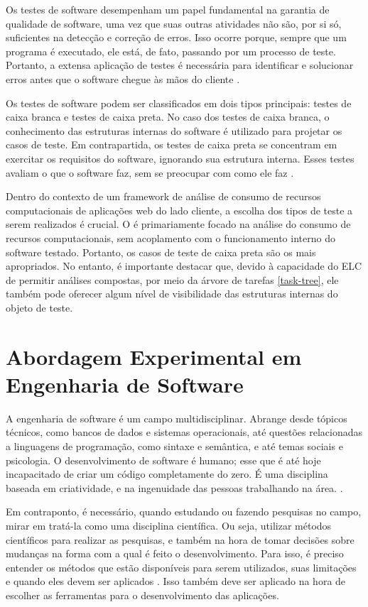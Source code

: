\documentclass[12pt]{tcc}
\begin{document}
		Os testes de software desempenham um papel fundamental na garantia de qualidade de software, uma vez que suas outras atividades não são, por si só, suficientes na detecção e correção de erros.
		Isso ocorre porque, sempre que um programa é executado, ele está, de fato, passando por um processo de teste.
		Portanto, a extensa aplicação de testes é necessária para identificar e solucionar erros antes que o software chegue às mãos do cliente \citep{pressman2009software}.

		Os testes de software podem ser classificados em dois tipos principais: testes de caixa branca e testes de caixa preta.
		No caso dos testes de caixa branca, o conhecimento das estruturas internas do software é utilizado para projetar os casos de teste.
		Em contrapartida, os testes de caixa preta se concentram em exercitar os requisitos do software, ignorando sua estrutura interna. Esses testes avaliam o que o software faz, sem se preocupar com como ele faz \citep{pressman2009software}.

		Dentro do contexto de um framework de análise de consumo de recursos computacionais de aplicações web do lado cliente, a escolha dos tipos de teste a serem realizados é crucial.
		O  é primariamente focado na análise do consumo de recursos computacionais, sem acoplamento com o funcionamento interno do software testado.
		Portanto, os casos de teste de caixa preta são os mais apropriados.
		No entanto, é importante destacar que, devido à capacidade do ELC de permitir análises compostas, por meio da árvore de tarefas \ref{task-tree}, ele também pode oferecer algum nível de visibilidade das estruturas internas do objeto de teste.


		\section{Abordagem Experimental em Engenharia de Software}
		\label{cap:engenharia-de-software-experimental}

		A engenharia de software é um campo multidisciplinar. Abrange desde tópicos técnicos, como bancos de dados e sistemas operacionais, até questões relacionadas a linguagens de programação, como sintaxe e semântica, e até temas sociais e  psicologia. O desenvolvimento de software é humano; esse que é até hoje incapacitado de criar um código completamente do zero. É uma disciplina baseada em criatividade, e na ingenuidade das pessoas trabalhando na área. \citep{wohlin2012experimentation}.

		Em contraponto, é necessário, quando estudando ou fazendo pesquisas no campo, mirar em tratá-la como uma disciplina científica. Ou seja, utilizar métodos científicos para realizar as pesquisas, e também na hora de tomar decisões sobre mudanças na forma com a qual é feito o desenvolvimento. Para isso, é preciso entender os métodos que estão disponíveis para serem utilizados, suas limitações e quando eles devem ser aplicados \citep{wohlin2012experimentation}. Isso também deve ser aplicado na hora de escolher as ferramentas para o desenvolvimento das aplicações.
\end{document}
